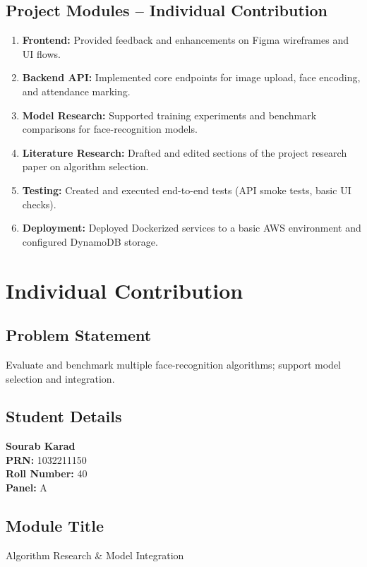 \documentclass[openany]{report}
\begin{document}
\section{Project Modules – Individual Contribution}
\begin{enumerate}
  \item \textbf{Frontend:} Provided feedback and enhancements on Figma wireframes and UI flows.
  \item \textbf{Backend API:} Implemented core endpoints for image upload, face encoding, and attendance marking.
  \item \textbf{Model Research:} Supported training experiments and benchmark comparisons for face-recognition models.
  \item \textbf{Literature Research:} Drafted and edited sections of the project research paper on algorithm selection.
  \item \textbf{Testing:} Created and executed end-to-end tests (API smoke tests, basic UI checks).
  \item \textbf{Deployment:} Deployed Dockerized services to a basic AWS environment and configured DynamoDB storage.
\end{enumerate}
\chapter{Individual Contribution}
\section{Problem Statement}
Evaluate and benchmark multiple face-recognition algorithms; support model selection and integration.

\section{Student Details}
\textbf{Sourab Karad} \\
\textbf{PRN:} 1032211150 \\
\textbf{Roll Number:} 40 \\
\textbf{Panel:} A \\

\section{Module Title}
Algorithm Research \& Model Integration
\end{document}

